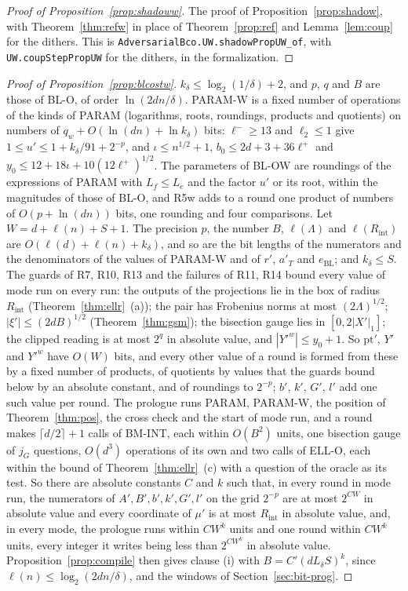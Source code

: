 \documentclass[11pt]{amsart}
\theoremstyle{definition}
\numberwithin{equation}{section}
\begin{document}
\begin{proof}[Proof of Proposition~\ref{prop:shadoww}]
The proof of Proposition~\ref{prop:shadow}, with Theorem~\ref{thm:refw} in place of Theorem~\ref{prop:ref} and Lemma~\ref{lem:coup} for the dithers. This is \texttt{AdversarialBco.\allowbreak UW.\allowbreak shadowPropUW\_of}, with \texttt{UW.\allowbreak coupStepPropUW} for the dithers, in the formalization.
\end{proof}

\begin{proof}[Proof of Proposition~\ref{prop:blcostw}]
$k_\delta\le\log_2(1/\delta)+2$, and $p$, $q$ and $B$ are those of BL-O, of order $\ln(2dn/\delta)$. PARAM-W is a fixed number of operations of the kinds of PARAM (logarithms, roots, roundings, products and quotients) on numbers of $q_w+O(\ln(dn)+\ln k_\delta)$ bits: $\ell^-\ge13$ and $\ell_2\le1$ give $1\le u'\le1+k_\delta/91+2^{-p}$, and $\iota\le n^{1/2}+1$, $b_0\le2d+3+36\ell^+$ and $y_0\le12+18\iota+10(12\ell^+)^{1/2}$. The parameters of BL-OW are roundings of the expressions of PARAM with $L_f\le L_e$ and the factor $u'$ or its root, within the magnitudes of those of BL-O, and R5w adds to a round one product of numbers of $O(p+\ln(dn))$ bits, one rounding and four comparisons. Let $W=d+\ell(n)+S+1$. The precision $p$, the number $B$, $\ell(\Lambda)$ and $\ell(R_{\mathrm{int}})$ are $O(\ell(d)+\ell(n)+k_\delta)$, and so are the bit lengths of the numerators and the denominators of the values of PARAM-W and of $r'$, $a'_T$ and $e_{\mathrm{BL}}$; and $k_\delta\le S$. The guards of R7, R10, R13 and the failures of R11, R14 bound every value of mode run on every run: the outputs of the projections lie in the box of radius $R_{\mathrm{int}}$ (Theorem~\ref{thm:ellr}~(a)); the pair has Frobenius norms at most $(2\Lambda)^{1/2}$; $|\xi'|\le(2dB)^{1/2}$ (Theorem~\ref{thm:gsm}); the bisection gauge lies in $[0,2|X'|_1]$; the clipped reading is at most $2^q$ in absolute value, and $|Y'^w|\le y_0+1$. So $\mathrm{pt}'$, $Y'$ and $Y'^w$ have $O(W)$ bits, and every other value of a round is formed from these by a fixed number of products, of quotients by values that the guards bound below by an absolute constant, and of roundings to $2^{-p}$; $b'$, $k'$, $G'$, $l'$ add one such value per round. The prologue runs PARAM, PARAM-W, the position of Theorem~\ref{thm:pos}, the cross check and the start of mode run, and a round makes $\lceil d/2\rceil+1$ calls of BM-INT, each within $O(B^2)$ units, one bisection gauge of $j_G$ questions, $O(d^3)$ operations of its own and two calls of ELL-O, each within the bound of Theorem~\ref{thm:ellr}~(c) with a question of the oracle as its test. So there are absolute constants $C$ and $k$ such that, in every round in mode run, the numerators of $A',B',b',k',G',l'$ on the grid $2^{-p}$ are at most $2^{CW}$ in absolute value and every coordinate of $\mu'$ is at most $R_{\mathrm{int}}$ in absolute value, and, in every mode, the prologue runs within $CW^k$ units and one round within $CW^k$ units, every integer it writes being less than $2^{CW^k}$ in absolute value. Proposition~\ref{prop:compile} then gives clause (i) with $B=C'(dL_\delta S)^k$, since $\ell(n)\le\log_2(2dn/\delta)$, and the windows of Section~\ref{sec:bit-prog}. 
\end{proof}
\end{document}
